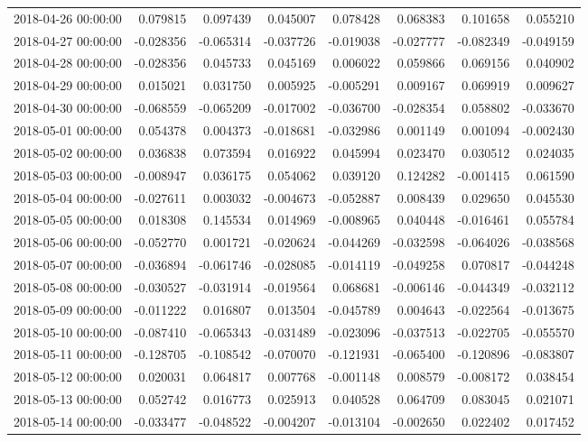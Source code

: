 \begin{tabular}{lrrrrrrr}
2018-04-26 00:00:00 & 0.079815 & 0.097439 & 0.045007 & 0.078428 & 0.068383 & 0.101658 & 0.055210 \\
2018-04-27 00:00:00 & -0.028356 & -0.065314 & -0.037726 & -0.019038 & -0.027777 & -0.082349 & -0.049159 \\
2018-04-28 00:00:00 & -0.028356 & 0.045733 & 0.045169 & 0.006022 & 0.059866 & 0.069156 & 0.040902 \\
2018-04-29 00:00:00 & 0.015021 & 0.031750 & 0.005925 & -0.005291 & 0.009167 & 0.069919 & 0.009627 \\
2018-04-30 00:00:00 & -0.068559 & -0.065209 & -0.017002 & -0.036700 & -0.028354 & 0.058802 & -0.033670 \\
2018-05-01 00:00:00 & 0.054378 & 0.004373 & -0.018681 & -0.032986 & 0.001149 & 0.001094 & -0.002430 \\
2018-05-02 00:00:00 & 0.036838 & 0.073594 & 0.016922 & 0.045994 & 0.023470 & 0.030512 & 0.024035 \\
2018-05-03 00:00:00 & -0.008947 & 0.036175 & 0.054062 & 0.039120 & 0.124282 & -0.001415 & 0.061590 \\
2018-05-04 00:00:00 & -0.027611 & 0.003032 & -0.004673 & -0.052887 & 0.008439 & 0.029650 & 0.045530 \\
2018-05-05 00:00:00 & 0.018308 & 0.145534 & 0.014969 & -0.008965 & 0.040448 & -0.016461 & 0.055784 \\
2018-05-06 00:00:00 & -0.052770 & 0.001721 & -0.020624 & -0.044269 & -0.032598 & -0.064026 & -0.038568 \\
2018-05-07 00:00:00 & -0.036894 & -0.061746 & -0.028085 & -0.014119 & -0.049258 & 0.070817 & -0.044248 \\
2018-05-08 00:00:00 & -0.030527 & -0.031914 & -0.019564 & 0.068681 & -0.006146 & -0.044349 & -0.032112 \\
2018-05-09 00:00:00 & -0.011222 & 0.016807 & 0.013504 & -0.045789 & 0.004643 & -0.022564 & -0.013675 \\
2018-05-10 00:00:00 & -0.087410 & -0.065343 & -0.031489 & -0.023096 & -0.037513 & -0.022705 & -0.055570 \\
2018-05-11 00:00:00 & -0.128705 & -0.108542 & -0.070070 & -0.121931 & -0.065400 & -0.120896 & -0.083807 \\
2018-05-12 00:00:00 & 0.020031 & 0.064817 & 0.007768 & -0.001148 & 0.008579 & -0.008172 & 0.038454 \\
2018-05-13 00:00:00 & 0.052742 & 0.016773 & 0.025913 & 0.040528 & 0.064709 & 0.083045 & 0.021071 \\
2018-05-14 00:00:00 & -0.033477 & -0.048522 & -0.004207 & -0.013104 & -0.002650 & 0.022402 & 0.017452 \\

\end{tabular}
